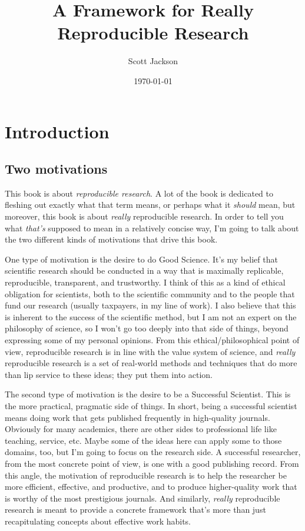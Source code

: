 \documentclass{book}
\title{A Framework for Really Reproducible Research}
\author{Scott Jackson}
\date{\today}
\begin{document}
\maketitle

\setcounter{tocdepth}{3}
\tableofcontents
\vspace*{1cm}

\chapter{Introduction}
\label{sec-1}
\section{Two motivations}
\label{sec-1-1}

This book is about \emph{reproducible research}. A lot of the book is dedicated to fleshing out exactly what that term means, or perhaps what it \emph{should} mean, but moreover, this book is about \emph{really} reproducible research.  In order to tell you what \emph{that's} supposed to mean in a relatively concise way, I'm going to talk about the two different kinds of motivations that drive this book.

One type of motivation is the desire to do Good Science.  It's my belief that scientific research should be conducted in a way that is maximally replicable, reproducible, transparent, and trustworthy.  I think of this as a kind of ethical obligation for scientists, both to the scientific community and to the people that fund our research (usually taxpayers, in my line of work).  I also believe that this is inherent to the success of the scientific method, but I am not an expert on the philosophy of science, so I won't go too deeply into that side of things, beyond expressing some of my personal opinions.  From this ethical/philosophical point of view, reproducible research is in line with the value system of science, and \emph{really} reproducible research is a set of real-world methods and techniques that do more than lip service to these ideas; they put them into action.

The second type of motivation is the desire to be a Successful Scientist.  This is the more practical, pragmatic side of things. In short, being a successful scientist means doing work that gets published frequently in high-quality journals.  Obviously for many academics, there are other sides to professional life like teaching, service, etc.  Maybe some of the ideas here can apply some to those domains, too, but I'm going to focus on the research side. A successful researcher, from the most concrete point of view, is one with a good publishing record.  From this angle, the motivation of reproducible research is to help the researcher be more efficient, effective, and productive, and to produce higher-quality work that is worthy of the most prestigious journals. And similarly, \emph{really} reproducible research is meant to provide a concrete framework that's more than just recapitulating concepts about effective work habits.
\end{document}
